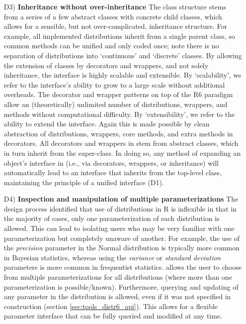 \begin{itemize}
\item[D3)] \textbf{Inheritance without over-inheritance} The class structure stems from a series of a few abstract classes with concrete child classes, which allows for a sensible, but not over-complicated, inheritance structure. For example, all implemented distributions inherit from a single parent class, so common methods can be unified and only coded once; note there is no separation of distributions into `continuous' and `discrete' classes. By allowing the extension of classes by decorators and wrappers, and not solely inheritance, the interface is highly scalable and extensible. By `scalability', we refer to the interface's ability to grow to a large scale without additional overheads. The decorator and wrapper patterns on top of the R6 paradigm allow an (theoretically) unlimited number of distributions, wrappers, and methods without computational difficulty. By `extensibility', we refer to the ability to extend the interface. Again this is made possible by clean abstraction of distributions, wrappers, core methods, and extra methods in decorators. All decorators and wrappers in  stem from abstract classes, which in turn inherit from the  super-class. In doing so, any method of expanding an object's interface in  (i.e., via decorators, wrappers, or inheritance) will automatically lead to an interface that inherits from the top-level class, maintaining the principle of a unified interface (D1).

\item[D4)] \textbf{Inspection and manipulation of multiple parameterizations} The design process identified that use of distributions in R  is inflexible in that in the majority of cases, only one parameterization of each distribution is allowed. This can lead to isolating users who may be very familiar with one parameterization but completely unaware of another. For example, the use of the \textit{precision} parameter in the Normal distribution is typically more common in Bayesian statistics, whereas using the \textit{variance} or \textit{standard deviation} parameters is more common in frequentist statistics.  allows the user to choose from multiple parameterizations for all distributions (where more than one parameterization is possible/known). Furthermore, querying and updating of any parameter in the distribution is allowed, even if it was not specified in construction (section \ref{sec:tools_distr6_api}). This allows for a flexible parameter interface that can be fully queried and modified at any time.


\end{itemize}
